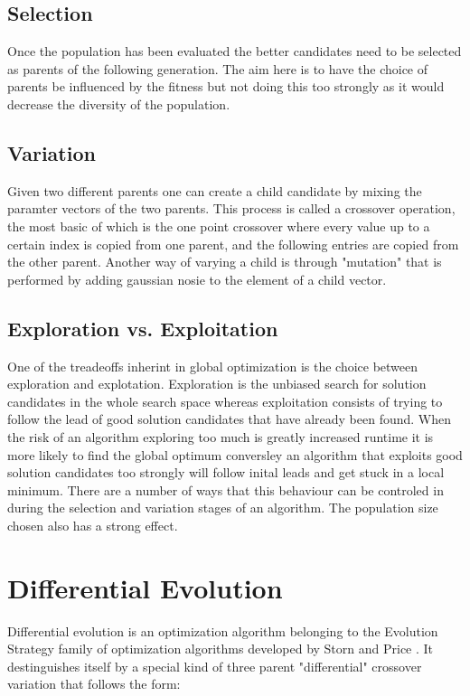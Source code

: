 \documentclass[a4paper,titlepage]{report}
\begin{document}
\subsection{Selection}

Once the population has been evaluated the better candidates need to be selected as parents of the following generation. The aim here is to have the choice of parents be influenced by the fitness but not doing this too strongly as it would decrease the diversity of the population.


\subsection{Variation}

Given two different parents one can create a child candidate by mixing the paramter vectors of the two parents. This process is called a crossover operation, the most basic of which is the one point crossover where every value up to a certain index is copied from one parent, and the following entries are copied from the other parent. Another way of varying a child  is through "mutation" that is performed by adding gaussian nosie to the element of a child vector.


\subsection{Exploration vs. Exploitation}

One of the treadeoffs inherint in global optimization is the choice between exploration and explotation. Exploration is the unbiased search for solution candidates in the whole search space whereas exploitation consists of trying to follow the lead of good solution candidates that have already been found. When the risk of an algorithm exploring too much is greatly increased runtime it is more likely to find the global optimum conversley an algorithm that exploits good solution candidates too strongly will follow inital leads and get stuck in a local minimum. There are a number of ways that this behaviour can be controled in during the selection and variation stages of an algorithm. The population size chosen also has a strong effect.


\section{Differential Evolution}

Differential evolution is an optimization algorithm belonging to the Evolution Strategy family of optimization algorithms developed by Storn and Price \cite{storn}. It destinguishes itself by a special kind of three parent "differential" crossover variation that follows the form:
\end{document}
